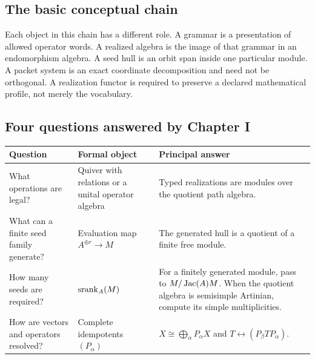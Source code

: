 \subsection*{The basic conceptual chain}

Each object in this chain has a different role.  A grammar is a presentation of allowed operator words.  A realized algebra is the image of that grammar in an endomorphism algebra.  A seed hull is an orbit span inside one particular module.  A packet system is an exact coordinate decomposition and need not be orthogonal.  A realization functor is required to preserve a declared mathematical profile, not merely the vocabulary.

\subsection*{Four questions answered by Chapter I}
\begin{center}
\begin{tabularx}{0.96\textwidth}{@{}>{\raggedright\arraybackslash}p{}Y Y@{}}
\toprule
\textbf{Question} & \textbf{Formal object} & \textbf{Principal answer}\\
\midrule
What operations are legal? & Quiver with relations or a unital operator algebra & Typed realizations are modules over the quotient path algebra.\\
What can a finite seed family generate? & Evaluation map \(A^{\oplus r}\to M\) & The generated hull is a quotient of a finite free module.\\
How many seeds are required? & \(\operatorname{srank}_A(M)\) & For a finitely generated module, pass to \(M/\operatorname{Jac}(A)M\). When the quotient algebra is semisimple Artinian, compute its simple multiplicities.\\
How are vectors and operators resolved? & Complete idempotents \((P_\alpha)\) & \(X\cong\bigoplus_\alpha P_\alpha X\) and \(T\leftrightarrow(P_\beta TP_\alpha)\).\\
\bottomrule
\end{tabularx}
\end{center}

